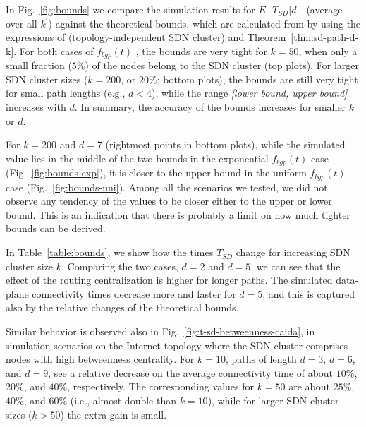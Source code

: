 In Fig.~\ref{fig:bounds} we compare the simulation results for $E[T_{SD}|d]$ (average over all $k^{'}$) against the theoretical bounds, which are calculated from  by using the expressions of  (topology-independent SDN cluster) and Theorem~\ref{thm:sd-path-d-k}. For both cases of $f_{bgp}(t)$ %
, the bounds are very tight for $k=50$, when only a small fraction ($5\%$) of the nodes belong to the SDN cluster (top plots). For larger SDN cluster sizes ($k=200$, or $20\%$; bottom plots), the bounds are still very tight for small path lengths (e.g., $d<4$), while the range \textit{[lower bound, upper bound]} increases with $d$.  In summary, the accuracy of the bounds increases for smaller $k$ or $d$.%

For $k=200$ and $d=7$ (rightmost points in bottom plots), while the simulated value lies in the middle of the two bounds in the exponential $f_{bgp}(t)$ case (Fig.~\ref{fig:bounds-exp}), it is closer to the upper bound in the uniform $f_{bgp}(t)$ case (Fig.~\ref{fig:bounds-uni}). Among all the scenarios we tested, we did not observe any tendency of the values to be closer either to the upper or lower bound. This is an indication that there is probably a limit on how much tighter bounds can be derived.


In Table~\ref{table:bounds}, we show how the times $T_{SD}$ change for increasing SDN cluster size $k$. Comparing the two cases, $d=2$ and $d=5$, we can see that the effect of the routing centralization is higher for longer paths. The simulated data-plane connectivity times decrease more and faster for $d=5$, and this is captured also by the relative changes of the theoretical bounds. 

Similar behavior is observed also in Fig.~\ref{fig:t-sd-betweenness-caida}, in simulation scenarios on the Internet topology where the SDN cluster comprises nodes with high betweenness centrality. For $k=10$, paths of length $d=3$, $d=6$, and $d=9$, see a relative decrease on the average connectivity time of about $10\%$, $20\%$, and $40\%$, respectively. The corresponding values for $k=50$ are about $25\%$, $40\%$, and $60\%$ (i.e., almost double than $k=10$), while for larger SDN cluster sizes ($k>50$) the extra gain is small.

